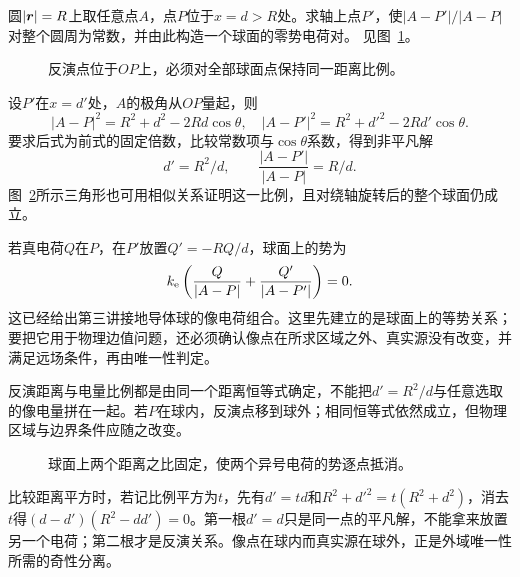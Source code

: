 \begin{example}[距离比与反演点]\label{ex:es1-e5}
圆$|\bm{r}|=R$上取任意点$A$，点$P$位于$x=d>R$处。求轴上点$P'$，使$|A-P'|/|A-P|$对整个圆周为常数，并由此构造一个球面的零势电荷对。 见图~\ref{fig:es1-e5-q}。
\end{example}

\begin{figure}[H]\centering
{}
\caption{反演点位于$OP$上，必须对全部球面点保持同一距离比例。}\label{fig:es1-e5-q}
\end{figure}
\begin{solution}
设$P'$在$x=d'$处，$A$的极角从$OP$量起，则
\[|A-P|^2=R^2+d^2-2Rd\cos\theta,
\quad |A-P'|^2=R^2+d'^2-2Rd'\cos\theta.\]
要求后式为前式的固定倍数，比较常数项与$\cos\theta$系数，得到非平凡解
\[\boxed{d'=R^2/d,\qquad\frac{|A-P'|}{|A-P|}=R/d}.\]
图~\ref{fig:es1-e5-s}所示三角形也可用相似关系证明这一比例，且对绕轴旋转后的整个球面仍成立。

若真电荷$Q$在$P$，在$P'$放置$Q'=-RQ/d$，球面上的势为
\[k_{\rm e}\left(\frac Q{|A-P|}+\frac{Q'}{|A-P'|}\right)=0.\]
这已经给出第三讲接地导体球的像电荷组合。这里先建立的是球面上的等势关系；要把它用于物理边值问题，还必须确认像点在所求区域之外、真实源没有改变，并满足远场条件，再由唯一性判定。

反演距离与电量比例都是由同一个距离恒等式确定，不能把$d'=R^2/d$与任意选取的像电量拼在一起。若$P$在球内，反演点移到球外；相同恒等式依然成立，但物理区域与边界条件应随之改变。
\begin{figure}[H]\centering
{}
\caption{球面上两个距离之比固定，使两个异号电荷的势逐点抵消。}\label{fig:es1-e5-s}
\end{figure}


比较距离平方时，若记比例平方为$t$，先有$d'=td$和$R^2+d'^2=t(R^2+d^2)$，消去$t$得$(d-d')(R^2-dd')=0$。第一根$d'=d$只是同一点的平凡解，不能拿来放置另一个电荷；第二根才是反演关系。像点在球内而真实源在球外，正是外域唯一性所需的奇性分离。
\end{solution}

